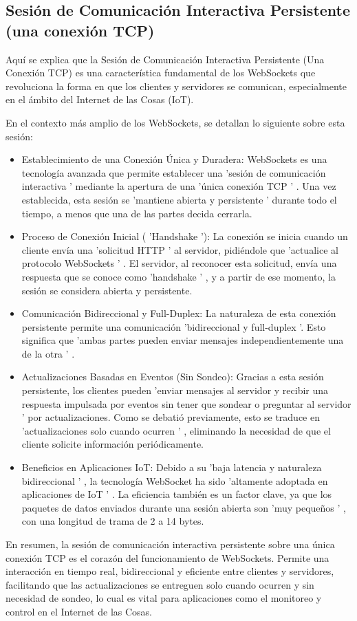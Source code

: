 \documentclass{report}
\begin{document}
\subsection{Sesión de Comunicación Interactiva Persistente (una conexión TCP)}
Aquí se explica que la  Sesión de Comunicación Interactiva Persistente (Una Conexión TCP)  es una característica fundamental 
de los  WebSockets  que revoluciona la forma en que los clientes y servidores se comunican, especialmente en el ámbito del Internet de las Cosas (IoT).

En el contexto más amplio de los WebSockets, se  detallan lo siguiente sobre esta sesión:
\begin{itemize}
    \item Establecimiento de una Conexión Única y Duradera:  WebSockets es una tecnología avanzada que permite establecer una   'sesión de 
    comunicación interactiva '  mediante la apertura de una   'única conexión TCP ' . Una vez establecida, esta sesión se   'mantiene abierta y persistente '  
    durante todo el tiempo, a menos que una de las partes decida cerrarla.
    \item Proceso de Conexión Inicial ( 'Handshake '):  La conexión se inicia cuando un cliente envía una   'solicitud HTTP '  
    al servidor, pidiéndole que   'actualice al protocolo WebSockets ' . El servidor, al reconocer esta solicitud, envía una respuesta que se conoce 
    como 'handshake ' , y a partir de ese momento, la sesión se considera abierta y persistente.
    \item Comunicación Bidireccional y Full-Duplex:  La naturaleza de esta conexión persistente permite una comunicación   'bidireccional y full-duplex '. 
    Esto significa que   'ambas partes pueden enviar mensajes independientemente una de la otra ' .
    \item Actualizaciones Basadas en Eventos (Sin Sondeo):  Gracias a esta sesión persistente, los clientes pueden   'enviar mensajes al servidor y recibir 
    una respuesta impulsada por eventos sin tener que sondear o preguntar al servidor '  por actualizaciones. Como se debatió previamente, esto se traduce 
    en   'actualizaciones solo cuando ocurren ' , eliminando la necesidad de que el cliente solicite información periódicamente.
    \item Beneficios en Aplicaciones IoT:  Debido a su   'baja latencia y naturaleza bidireccional ' , la tecnología WebSocket ha sido  
    'altamente adoptada en aplicaciones de IoT ' . La eficiencia también es un factor clave, ya que los paquetes de datos enviados durante 
    una sesión abierta son   'muy pequeños ' , con una longitud de trama de 2 a 14 bytes.
\end{itemize}
En resumen, la  sesión de comunicación interactiva persistente sobre una única conexión TCP  es el corazón del funcionamiento de WebSockets. 
Permite una interacción en tiempo real, bidireccional y eficiente entre clientes y servidores, facilitando que las actualizaciones se entreguen 
solo cuando ocurren y sin necesidad de sondeo, lo cual es vital para aplicaciones como el monitoreo y control en el Internet de las Cosas.
\end{document}
